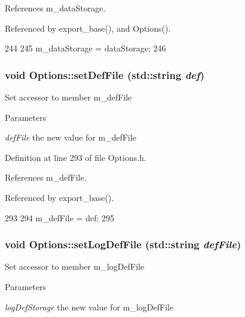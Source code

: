 References m\_\-dataStorage.

Referenced by export\_\-base(), and Options().


\begin{DoxyCode}
244                                                {
245                 m_dataStorage = dataStorage;
246         }
\end{DoxyCode}
\hypertarget{classOptions_a3c8bed9867ac5805489d78061e55bd1a}{
\subsubsection[{setDefFile}]{\setlength{\rightskip}{0pt plus 5cm}void Options::setDefFile (std::string {\em def})}}
\label{classOptions_a3c8bed9867ac5805489d78061e55bd1a}
Set accessor to member m\_\-defFile 
\begin{DoxyParams}{Parameters}
\item[{\em defFile}]the new value for m\_\-defFile \end{DoxyParams}


Definition at line 293 of file Options.h.

References m\_\-defFile.

Referenced by export\_\-base().


\begin{DoxyCode}
293                                         {
294                 m_defFile = def;
295         }
\end{DoxyCode}
\hypertarget{classOptions_a52e2995912a71f51c230dd6bf28b6a94}{
\subsubsection[{setLogDefFile}]{\setlength{\rightskip}{0pt plus 5cm}void Options::setLogDefFile (std::string {\em defFile})}}
\label{classOptions_a52e2995912a71f51c230dd6bf28b6a94}
Set accessor to member m\_\-logDefFile 
\begin{DoxyParams}{Parameters}
\item[{\em logDefStorage}]the new value for m\_\-logDefFile \end{DoxyParams}



